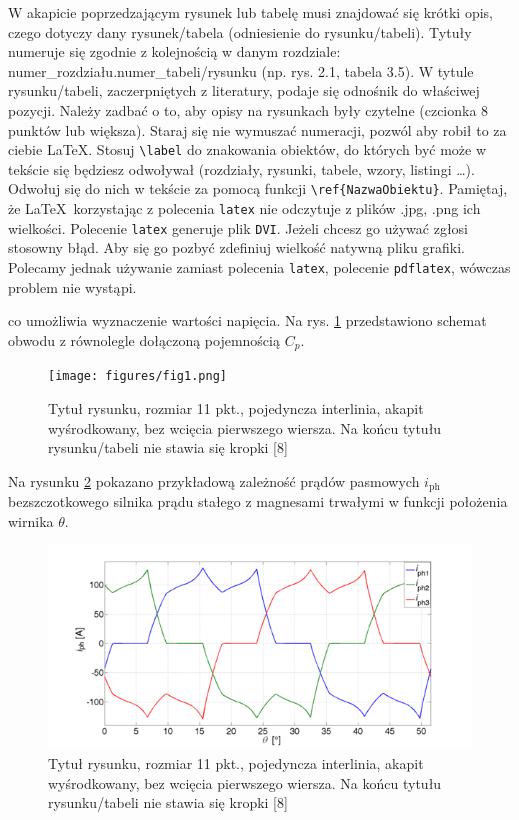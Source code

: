 \documentclass[12pt,twoside]{article}
\begin{document}
W akapicie poprzedzającym rysunek lub tabelę musi znajdować się krótki opis, czego dotyczy dany rysunek/tabela (odniesienie do rysunku/tabeli). Tytuły numeruje się zgodnie z kolejnością w danym rozdziale: numer\_rozdziału.numer\_tabeli/rysunku (np. rys. 2.1, tabela 3.5). W tytule rysunku/tabeli, zaczerpniętych z literatury, podaje się odnośnik do właściwej pozycji. Należy zadbać o to, aby opisy na rysunkach były czytelne (czcionka 8 punktów lub większa). Staraj się nie wymuszać numeracji, pozwól aby robił to za ciebie \LaTeX. Stosuj \verb!\label! do znakowania obiektów, do których być może w tekście się będziesz odwoływał (rozdziały, rysunki, tabele, wzory, listingi \ldots). Odwołuj się do nich w tekście  za pomocą funkcji \verb!\ref{NazwaObiektu}!. Pamiętaj, że \LaTeX\, korzystając z polecenia \verb|latex| nie odczytuje z plików .jpg, .png ich wielkości. Polecenie \verb|latex| generuje plik \verb|DVI|. Jeżeli chcesz go używać zgłosi stosowny błąd. Aby się go pozbyć zdefiniuj wielkość natywną pliku grafiki. Polecamy jednak używanie zamiast polecenia \verb|latex|, polecenie \verb|pdflatex|, wówczas problem nie wystąpi.\\

\begin{example}
	[\ldots] co umożliwia wyznaczenie wartości napięcia. Na rys. \ref{Fig:schemat} przedstawiono schemat obwodu z równolegle dołączoną pojemnością $C_p$.
\end{example}

\begin{figure}[ht]
	\centering
	\texttt{[image: figures/fig1.png]}
	\caption{Tytuł rysunku, rozmiar 11 pkt., pojedyncza interlinia, akapit wyśrodkowany, bez wcięcia pierwszego wiersza. Na końcu tytułu rysunku/tabeli nie stawia się kropki [8]}
	\label{Fig:schemat}
\end{figure}

\begin{example}
	[\ldots] Na rysunku \ref{Fig:wykres} pokazano przykładową zależność prądów pasmowych $i_\mathrm{ph}$ bezszczotkowego silnika prądu stałego z magnesami trwałymi w funkcji położenia wirnika $\theta$.
\end{example}

\begin{figure}[ht]
	\centering
	\includegraphics[width=12cm]{figures/fig2.png}
	\caption{Tytuł rysunku, rozmiar 11 pkt., pojedyncza interlinia, akapit wyśrodkowany, bez wcięcia pierwszego wiersza. Na końcu tytułu rysunku/tabeli nie stawia się kropki [8]}
	\label{Fig:wykres}
\end{figure}
\end{document}
